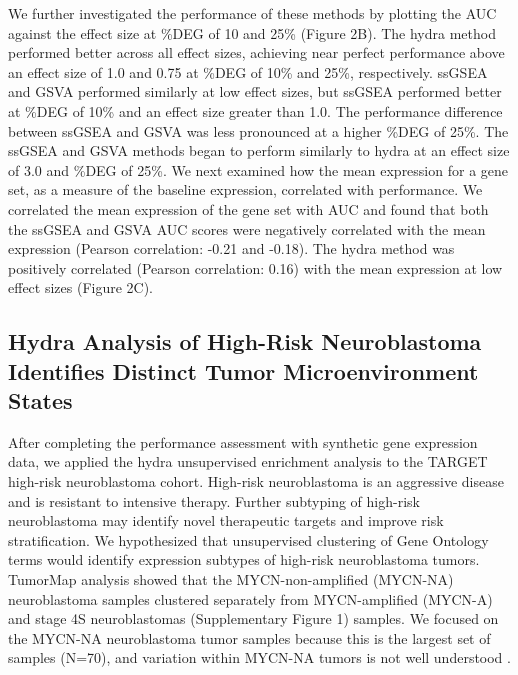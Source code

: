 \documentclass[10pt,letterpaper]{article}
\begin{document}
We further investigated the performance of these methods by plotting the AUC against the effect size at \%DEG of 10 and 25\% (Figure 2B). The hydra method performed better across all effect sizes, achieving near perfect performance above an effect size of 1.0 and 0.75 at \%DEG of 10\% and 25\%, respectively. ssGSEA and GSVA performed similarly at low effect sizes, but ssGSEA performed better at \%DEG of 10\% and an effect size greater than 1.0. The performance difference between ssGSEA and GSVA was less pronounced at a higher \%DEG of 25\%. The ssGSEA and GSVA methods began to perform similarly to hydra at an effect size of 3.0 and \%DEG of 25\%. We next examined how the mean expression for a gene set, as a measure of the baseline expression, correlated with performance. We correlated the mean expression of the gene set with AUC and found that both the ssGSEA and GSVA AUC scores were negatively correlated with the mean expression (Pearson correlation: -0.21 and -0.18). The hydra method was positively correlated (Pearson correlation: 0.16) with the mean expression at low effect sizes (Figure 2C).

\subsection{Hydra Analysis of High-Risk Neuroblastoma Identifies Distinct Tumor Microenvironment States}
After completing the performance assessment with synthetic gene expression data, we applied the hydra unsupervised enrichment analysis to the TARGET high-risk neuroblastoma cohort. High-risk neuroblastoma is an aggressive disease and is resistant to intensive therapy. Further subtyping of high-risk neuroblastoma may identify novel therapeutic targets and improve risk stratification. We hypothesized that unsupervised clustering of Gene Ontology terms would identify expression subtypes of high-risk neuroblastoma tumors. TumorMap analysis showed that the MYCN-non-amplified (MYCN-NA) neuroblastoma samples clustered separately from MYCN-amplified (MYCN-A) and stage 4S neuroblastomas (Supplementary Figure 1) samples. We focused on the MYCN-NA neuroblastoma tumor samples because this is the largest set of samples (N=70), and variation within MYCN-NA tumors is not well understood \cite{morgensternChallengeDefiningUltrahighrisk2019a}.
\end{document}
